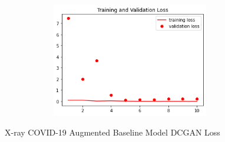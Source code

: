  \begin{figure}[H]
    \centering
    \includegraphics[width=1\textwidth,height=5cm,keepaspectratio]{Images/XceptionBaselineTrainingValidationLossXRayCOVID19AugmentedDCGAN.png}\\
    \caption{X-ray COVID-19 Augmented Baseline Model DCGAN Loss}
    \label{fig:X-ray COVID-19 Augmented Xception Model DCGAN Loss}
\end{figure}
